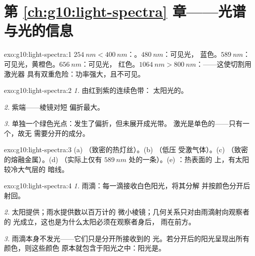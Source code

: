 \section*{第 \ref{ch:g10:light-spectra} 章——光谱与光的信息}

\begin{solution}{exo:g10:light-spectra:1}
$\qty{254}{nm} < \qty{400}{nm}$：。$\qty{480}{nm}$：可见光，
蓝色。$\qty{589}{nm}$：可见光，黄橙色。$\qty{656}{nm}$：可见光，
红色。$\qty{1064}{nm} > \qty{800}{nm}$：——这使切割用激光器
具有双重危险：功率强大，且不可见。
\end{solution}

\begin{solution}{exo:g10:light-spectra:2}
\emph{1.} 由红到紫的连续色带：
太阳光的。

\emph{2.} 紫端——棱镜对短
偏折最大。

\emph{3.} 单独一个绿色光点：发生了偏折，但未展开成光带。
激光是单色的——只有一个，故无
需要分开的成分。
\end{solution}

\begin{solution}{exo:g10:light-spectra:3}
(a) （致密的热灯丝）。(b) （低压
受激气体）。(c) （致密的熔融金属）。(d) 
（实际上仅有 $\qty{589}{nm}$ 处的一条）。(e) ：热表面的
上，有太阳较冷大气层的
暗线。
\end{solution}

\begin{solution}{exo:g10:light-spectra:4}
\emph{1.} 雨滴：每一滴接收白色阳光，将其分解
并按颜色分开后射回。

\emph{2.} 太阳提供；雨水提供数以百万计的
微小棱镜；几何关系只对由雨滴射向观察者的
光成立，这也是为什么太阳必须在观察者身后，
雨在前方。

\emph{3.} 雨滴本身不发光——它们只是分开所接收到的
光。若分开后的阳光呈现出所有颜色，则这些颜色
原本就包含于阳光之中：阳光是。
\end{solution}

